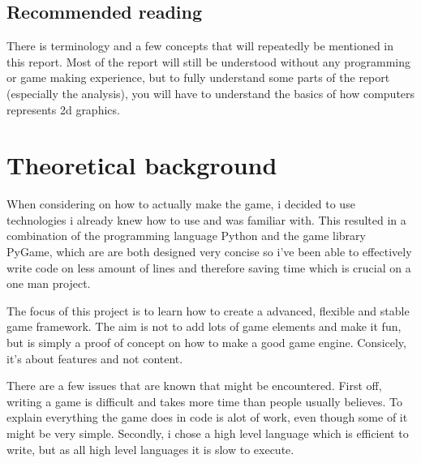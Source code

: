 \documentclass[a4paper,12pt]{article}
\begin{document}
\subsection{Recommended reading}
There is terminology and a few concepts that will repeatedly be mentioned in this report.
Most of the report will still be understood without any programming or game making experience, but to fully understand some parts of the report (especially the analysis), you will have to understand the basics of how computers represents 2d graphics.


\clearpage

\section{Theoretical background}


When considering on how to actually make the game, i decided to use technologies i already knew how to use and was familiar with. 
This resulted in a combination of the programming language Python and the game library PyGame, which are are both designed very concise so i've been able to effectively write code on less amount of lines and therefore saving time which is crucial on a one man project.

The focus of this project is to learn how to create a advanced, flexible and stable game framework.
The aim is not to add lots of game elements and make it fun, but is simply a proof of concept on how to make a good game engine.
Consicely, it's about features and not content.

There are a few issues that are known that might be encountered. First off, writing a game is difficult and takes more time than people usually believes. To explain everything the game does in code is alot of work, even though some of it might be very simple.
Secondly, i chose a high level language which is efficient to write, but as all high level languages it is slow to execute.  
\end{document}
